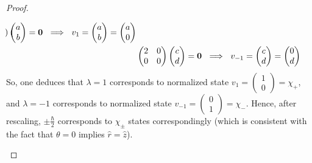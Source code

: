 \documentclass{article}
\begin{document}
\begin{proof}
\begin{itemize}
\begin{itemize}
\begin{align}
\begin{pmatrix}
                \end{pmatrix}\begin{pmatrix}
                    a\\b
                \end{pmatrix}=\bzero\ \implies\ v_1 = \begin{pmatrix}
                    a\\b
                \end{pmatrix} = \begin{pmatrix}
                    a\\0
                \end{pmatrix}\\
                &\begin{pmatrix}
                    2&0\\0&0
                \end{pmatrix}\begin{pmatrix}
                    c\\d
                \end{pmatrix} = \bzero\ \implies \ v_{-1}=\begin{pmatrix}
                    c\\d
                \end{pmatrix}=\begin{pmatrix}
                    0\\d
                \end{pmatrix}
            \end{align}
            So, one deduces that $\lambda=1$ corresponds to normalized state $v_1 = \begin{pmatrix}
                1\\0
            \end{pmatrix}=\chi_+$, and $\lambda=-1$ corresponds to normalized state $v_{-1}=\begin{pmatrix}
                0\\1
            \end{pmatrix}=\chi_-$. Hence, after rescaling, $\pm\frac{\hbar}{2}$ corresponds to $\chi_\pm$ states correspondingly (which is consistent with the fact that $\theta=0$ implies $\hat{r}=\hat{z}$).

            \hfil


\end{itemize}
\end{itemize}
\end{proof}
\end{document}

